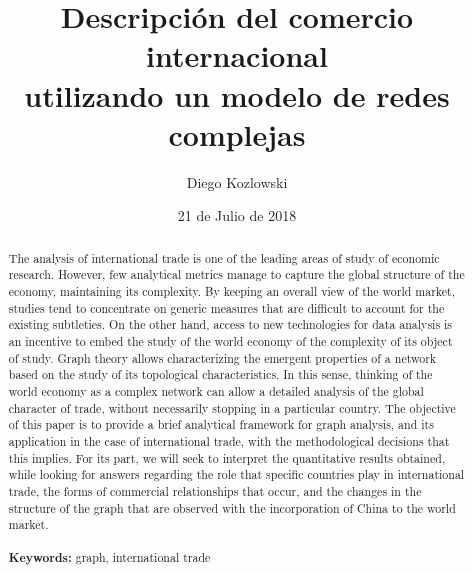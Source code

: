 \documentclass[a4paper]{article}
\begin{document}

\title{Descripción del comercio internacional\\utilizando un modelo de redes complejas}

\date{21 de Julio de 2018}


\author{Diego Kozlowski}
%
\maketitle


\begin{abstract} 

The analysis of international trade is one of the leading areas of study of economic research. However, few analytical metrics manage to capture the global structure of the economy, maintaining its complexity. By keeping an overall view of the world market, studies tend to concentrate on generic measures that are difficult to account for the existing subtleties. On the other hand, access to new technologies for data analysis is an incentive to embed the study of the world economy of the complexity of its object of study. Graph theory allows characterizing the emergent properties of a network based on the study of its topological characteristics.
In this sense, thinking of the world economy as a complex network can allow a detailed analysis of the global character of trade, without necessarily stopping in a particular country. The objective of this paper is to provide a brief analytical framework for graph analysis, and its application in the case of international trade, with the methodological decisions that this implies. For its part, we will seek to interpret the quantitative results obtained, while looking for answers regarding the role that specific countries play in international trade, the forms of commercial relationships that occur, and the changes in the structure of the graph that are observed with the incorporation of China to the world market.
\\~\\
\textbf{Keywords:} graph, international trade
\\~\\


\end{abstract}
\end{document}

